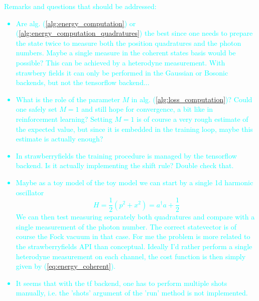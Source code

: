 \documentclass[reprint, amsmath, amssymb, aps]{revtex4-2}
\begin{document}
\textcolor{cyan}{
    Remarks and questions that should be addressed:
    \begin{itemize}
        \item Are alg. (\ref{alg:energy_computation}) or (\ref{alg:energy_computation_quadratures}) the best since one needs to prepare the state twice to measure both the position quadratures and the photon numbers. Maybe a single measure in the coherent states basis would be possible? This can be achieved by a heterodyne measurement. With strawbery fields it can only be performed in the Gaussian or Bosonic backends, but not the tensorflow backend...
        \item What is the role of the parameter $M$ in alg. (\ref{alg:loss_computation})? Could one safely set $M=1$ and still hope for convergence, a bit like in reinforcement learning? Setting $M=1$ is of course a very rough estimate of the expected value, but since it is embedded in the training loop, maybe this estimate is actually enough?
        \item In strawberryfields the training procedure is managed by the tensorflow backend. Is it actually implementing the shift rule? Double check that.
        \item Maybe as a toy model of the toy model we can start by a single 1d harmonic oscillator
        \begin{equation}
            H = \frac{1}{2}\left(p^2+x^2\right) = a^\dagger a+\frac{1}{2}
        \end{equation}
        We can then test measuring separately both quadratures and compare with a single measurement of the photon number. The correct statevector is of course the Fock vacuum in that case. For me the problem is more related to the strawberryfields API than conceptual. Ideally I'd rather perform a single heterodyne measurement on each channel, the cost function is then simply given by (\ref{eq:energy_coherent}).
        \item It seems that with the tf backend, one has to perform multiple shots manually, i.e. the 'shots' argument of the 'run' method is not implemented.

\end{itemize}}
\end{document}
